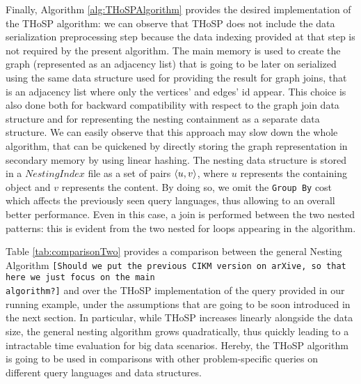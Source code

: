 Finally, Algorithm \ref{alg:THoSPAlgorithm} provides the desired implementation of the THoSP algorithm: we can observe that THoSP does not include the data serialization preprocessing step because the data indexing provided at that step is not required by the present algorithm. The main memory is used to create the graph (represented as an adjacency list) that is going to be later on serialized using the same data structure used for providing the result for graph joins, that is an adjacency list where only the vertices' and edges' id appear. This choice is also done both for backward compatibility with respect to the graph join data structure \cite{bergamimm17} and for representing the nesting containment as a separate data structure. We can easily observe that this approach may slow down the whole algorithm, that can be quickened by directly storing the graph representation in secondary memory by using linear hashing. The nesting data structure is stored in a $NestingIndex$ file as a set of pairs $\Braket{u,v}$, where $u$ represents the containing object and $v$ represents the content. By doing so, we omit the \texttt{Group By} cost which affects the previously seen query languages, thus allowing to an overall better performance. Even in this case, a join is performed between the two nested patterns: this is evident from the two nested for loops appearing in the algorithm. 

Table \ref{tab:comparisonTwo} provides a comparison between the general Nesting Algorithm \texttt{[Should we put the previous CIKM version on arXive, so that here we just focus on the main\\ algorithm?]} and over the THoSP implementation of the query provided in our running example, under the assumptions that are going to be soon introduced in the next section. In particular, while THoSP increases linearly alongside the data size, the general nesting algorithm grows quadratically, thus quickly leading to a intractable time evaluation for big data scenarios. Hereby, the THoSP algorithm is going to be used in comparisons with other problem-specific queries on different query languages and data structures.